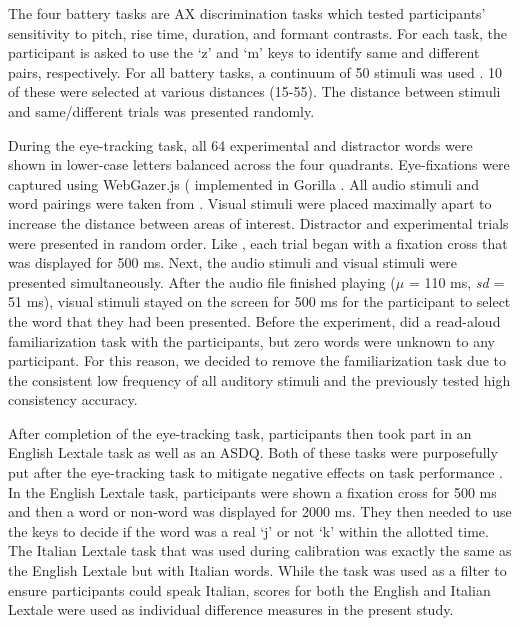 The four battery tasks are AX discrimination tasks which tested participants' sensitivity to pitch, rise time, duration, and formant contrasts. For each task, the participant is asked to use the `z' and `m' keys to identify same and different pairs, respectively. For all battery tasks, a continuum of 50 stimuli was used \citep{Krizman_2019}. 10 of these were selected at various distances (15-55). The distance between stimuli and same/different trials was presented randomly.

During the eye-tracking task, all 64 experimental and distractor words were shown in lower-case letters balanced across the four quadrants. Eye-fixations were captured using WebGazer.js (\citep{Papoutsaki} implemented in Gorilla \citep{Anwyl-Irvine_2019}. All audio stimuli and word pairings were taken from \cite{Sulpizio_McQueen_2012}. Visual stimuli were placed maximally apart to increase the distance between areas of interest. Distractor and experimental trials were presented in random order. Like \cite{Sulpizio_McQueen_2012}, each trial began with a fixation cross that was displayed for 500 ms. Next, the audio stimuli and visual stimuli were presented simultaneously. After the audio file finished playing ($\mu$ = 110 ms, \textit{sd} = 51 ms), visual stimuli stayed on the screen for 500 ms for the participant to select the word that they had been presented. Before the experiment, \cite{Sulpizio_McQueen_2012} did a read-aloud familiarization task with the participants, but zero words were unknown to any participant. For this reason, we decided to remove the familiarization task due to the consistent low frequency of all auditory stimuli and the previously tested high consistency accuracy.

After completion of the eye-tracking task, participants then took part in an English Lextale task as well as an ASDQ. Both of these tasks were purposefully put after the eye-tracking task to mitigate negative effects on task performance \citep{Chang_2024}. In the English Lextale task, participants were shown a fixation cross for 500 ms and then a word or non-word was displayed for 2000 ms. They then needed to use the keys to decide if the word was a real `j' or not `k' within the allotted time. The Italian Lextale task that was used during calibration was exactly the same as the English Lextale but with Italian words. While the task was used as a filter to ensure participants could speak Italian, scores for both the English and Italian Lextale were used as individual difference measures in the present study.

